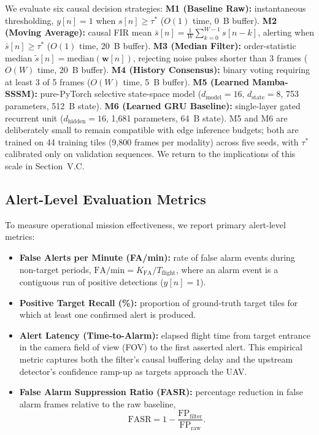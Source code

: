 \documentclass[conference]{IEEEtran}
\begin{document}
We evaluate six causal decision strategies:
\textbf{M1 (Baseline Raw):} instantaneous thresholding, $y[n] = 1$ when $s[n] \ge \tau^*$ ($O(1)$ time, 0~B buffer).
\textbf{M2 (Moving Average):} causal FIR mean $\bar{s}[n] = \frac{1}{W} \sum_{k=0}^{W-1} s[n-k]$, alerting when $\bar{s}[n] \ge \tau^*$ ($O(1)$ time, 20~B buffer).
\textbf{M3 (Median Filter):} order-statistic median $\tilde{s}[n] = \text{median}(\mathbf{w}[n])$, rejecting noise pulses shorter than 3 frames ($O(W)$ time, 20~B buffer).
\textbf{M4 (History Consensus):} binary voting requiring at least 3 of 5 frames ($O(W)$ time, 5~B buffer).
\textbf{M5 (Learned Mamba-SSSM):} pure-PyTorch selective state-space model ($d_{\text{model}}=16$, $d_{\text{state}}=8$, 753 parameters, 512~B state).
\textbf{M6 (Learned GRU Baseline):} single-layer gated recurrent unit ($d_{\text{hidden}}=16$, 1,681 parameters, 64~B state).
M5 and M6 are deliberately small to remain compatible with edge inference budgets; both are trained on 44 training tiles (9,800 frames per modality) across five seeds, with $\tau^*$ calibrated only on validation sequences. We return to the implications of this scale in Section~V.C.

\subsection{Alert-Level Evaluation Metrics}
To measure operational mission effectiveness, we report primary alert-level metrics:
\begin{itemize}
\item \textbf{False Alerts per Minute (FA/min):} rate of false alarm events during non-target periods, $\text{FA/min} = K_{\text{FA}} / T_{\text{flight}}$, where an alarm event is a contiguous run of positive detections ($y[n]=1$).
\item \textbf{Positive Target Recall (\%):} proportion of ground-truth target tiles for which at least one confirmed alert is produced.
\item \textbf{Alert Latency (Time-to-Alarm):} elapsed flight time from target entrance in the camera field of view (FOV) to the first asserted alert. This empirical metric captures both the filter's causal buffering delay and the upstream detector's confidence ramp-up as targets approach the UAV.
\item \textbf{False Alarm Suppression Ratio (FASR):} percentage reduction in false alarm frames relative to the raw baseline,
\begin{equation}
\text{FASR} = 1 - \frac{\text{FP}_{\text{filter}}}{\text{FP}_{\text{raw}}}.
\label{eq:fasr}
\end{equation}
\end{itemize}
\end{document}
